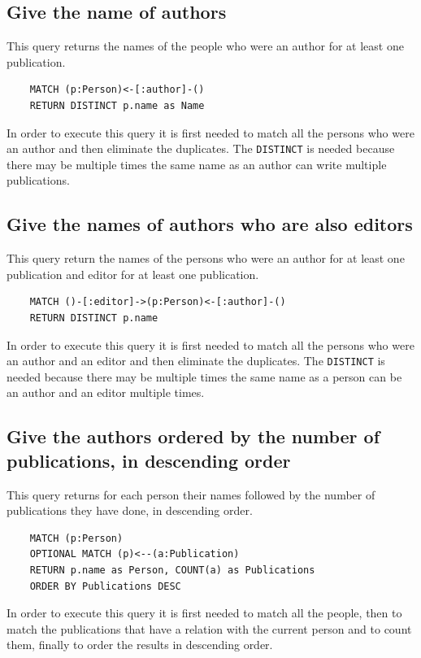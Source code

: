 \documentclass{article}
\begin{document}
\subsection{Give the name of authors}
This query returns the names of the people who were an author for at least one publication.

\begin{lstlisting}
    MATCH (p:Person)<-[:author]-()
    RETURN DISTINCT p.name as Name
\end{lstlisting}

In order to execute this query it is first needed to match all the persons who were an author and then eliminate the duplicates. The \texttt{DISTINCT} is needed because there may be multiple times the same name as an author can write multiple publications. 


\subsection{Give the names of authors who are also editors}
This query return the names of the persons who were an author for at least one publication and editor for at least one publication.

\begin{lstlisting}
    MATCH ()-[:editor]->(p:Person)<-[:author]-()
    RETURN DISTINCT p.name
\end{lstlisting}

In order to execute this query it is first needed to match all the persons who were an author and an editor and then eliminate the duplicates. The \texttt{DISTINCT} is needed because there may be multiple times the same name as a person can be an author and an editor multiple times. 

\subsection{Give the authors ordered by the number of publications, in descending order}
This query returns for each person their names followed by the number of publications they have done, in descending order.

\begin{lstlisting}
    MATCH (p:Person)
    OPTIONAL MATCH (p)<--(a:Publication)
    RETURN p.name as Person, COUNT(a) as Publications
    ORDER BY Publications DESC
\end{lstlisting}

In order to execute this query it is first needed to match all the people, then to match the publications that have a relation with the current person and to count them, finally to order the results in descending order.
\end{document}
